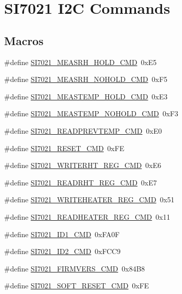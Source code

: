 \hypertarget{group__CMD}{}\section{S\+I7021 I2C Commands}
\label{group__CMD}
\subsection*{Macros}
\begin{DoxyCompactItemize}
\item 
\#define \hyperlink{group__CMD_ga999d78aa56f7bd9ce04bb52e691d6753}{S\+I7021\+\_\+\+M\+E\+A\+S\+R\+H\+\_\+\+H\+O\+L\+D\+\_\+\+C\+MD}~0x\+E5
\item 
\#define \hyperlink{group__CMD_ga7982df3514be8aa0cfef6e87e0aa48b0}{S\+I7021\+\_\+\+M\+E\+A\+S\+R\+H\+\_\+\+N\+O\+H\+O\+L\+D\+\_\+\+C\+MD}~0x\+F5
\item 
\#define \hyperlink{group__CMD_ga2afcdc38468c893701a91bbf41c3e3d5}{S\+I7021\+\_\+\+M\+E\+A\+S\+T\+E\+M\+P\+\_\+\+H\+O\+L\+D\+\_\+\+C\+MD}~0x\+E3
\item 
\#define \hyperlink{group__CMD_gad008920c3e715fc4c63032daca3bc5b0}{S\+I7021\+\_\+\+M\+E\+A\+S\+T\+E\+M\+P\+\_\+\+N\+O\+H\+O\+L\+D\+\_\+\+C\+MD}~0x\+F3
\item 
\#define \hyperlink{group__CMD_gaf69388821d62e94cccd567f8861743a3}{S\+I7021\+\_\+\+R\+E\+A\+D\+P\+R\+E\+V\+T\+E\+M\+P\+\_\+\+C\+MD}~0x\+E0
\item 
\#define \hyperlink{group__CMD_gaf46ed75ac39abc8aa85a2f08f6eaf2fb}{S\+I7021\+\_\+\+R\+E\+S\+E\+T\+\_\+\+C\+MD}~0x\+FE
\item 
\#define \hyperlink{group__CMD_gaec66f83a736566c680c195cad9f7cb7c}{S\+I7021\+\_\+\+W\+R\+I\+T\+E\+R\+H\+T\+\_\+\+R\+E\+G\+\_\+\+C\+MD}~0x\+E6
\item 
\#define \hyperlink{group__CMD_ga39482cdbef1a96514a58d25c30cab869}{S\+I7021\+\_\+\+R\+E\+A\+D\+R\+H\+T\+\_\+\+R\+E\+G\+\_\+\+C\+MD}~0x\+E7
\item 
\#define \hyperlink{group__CMD_gaf62a1fb7fe727aa31f52de3ce616e3a4}{S\+I7021\+\_\+\+W\+R\+I\+T\+E\+H\+E\+A\+T\+E\+R\+\_\+\+R\+E\+G\+\_\+\+C\+MD}~0x51
\item 
\#define \hyperlink{group__CMD_ga3b1583b7a4599056347a0f8fea5349fa}{S\+I7021\+\_\+\+R\+E\+A\+D\+H\+E\+A\+T\+E\+R\+\_\+\+R\+E\+G\+\_\+\+C\+MD}~0x11
\item 
\#define \hyperlink{group__CMD_ga4b71181e51a490ca8626758a80a0d14c}{S\+I7021\+\_\+\+I\+D1\+\_\+\+C\+MD}~0x\+F\+A0F
\item 
\#define \hyperlink{group__CMD_ga65ab7ac27fe593eb11f4b0c4c9a16319}{S\+I7021\+\_\+\+I\+D2\+\_\+\+C\+MD}~0x\+F\+C\+C9
\item 
\#define \hyperlink{group__CMD_ga2e429d79e5cca3c05d883b5509a88963}{S\+I7021\+\_\+\+F\+I\+R\+M\+V\+E\+R\+S\+\_\+\+C\+MD}~0x84\+B8
\item 
\#define \hyperlink{group__CMD_ga6d880c26eb3b8bff87e47ee43dd5e8a4}{S\+I7021\+\_\+\+S\+O\+F\+T\+\_\+\+R\+E\+S\+E\+T\+\_\+\+C\+MD}~0x\+FE
\end{DoxyCompactItemize}


